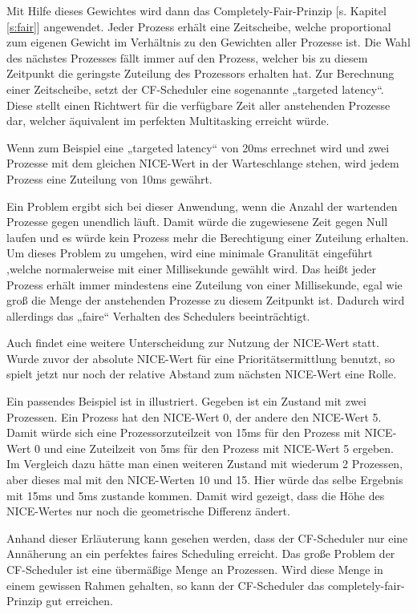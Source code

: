 Mit Hilfe dieses Gewichtes wird dann das \glqq Completely-Fair\grqq-Prinzip [s. Kapitel \ref{s:fair}] angewendet. Jeder Prozess erhält eine Zeitscheibe, welche proportional zum eigenen Gewicht im Verhältnis zu den Gewichten aller Prozesse ist. Die Wahl des nächstes Prozesses fällt immer auf den Prozess, welcher bis zu diesem Zeitpunkt die geringste Zuteilung des Prozessors erhalten hat.
Zur Berechnung einer Zeitscheibe, setzt der CF-Scheduler eine sogenannte „targeted latency“. Diese stellt einen Richtwert für die verfügbare Zeit aller anstehenden Prozesse dar, welcher äquivalent im perfekten Multitasking erreicht würde.

Wenn zum Beispiel eine „targeted latency“ von 20ms errechnet wird und zwei Prozesse mit dem gleichen \glqq NICE\grqq-Wert in der Warteschlange stehen, wird jedem Prozess eine Zuteilung von 10ms gewährt.

Ein Problem ergibt sich bei dieser Anwendung, wenn die Anzahl der wartenden Prozesse gegen unendlich läuft. Damit würde die zugewiesene Zeit gegen Null laufen und es würde kein Prozess mehr die Berechtigung einer Zuteilung erhalten. Um dieses Problem zu umgehen, wird eine minimale Granulität eingeführt ,welche normalerweise mit einer Millisekunde gewählt wird. Das heißt jeder Prozess erhält immer mindestens eine Zuteilung von einer Millisekunde, egal wie groß die Menge der anstehenden Prozesse zu diesem Zeitpunkt ist. Dadurch wird allerdings das „faire“ Verhalten des Schedulers beeinträchtigt. 

Auch findet eine weitere Unterscheidung zur Nutzung der \glqq NICE\grqq-Wert statt. Wurde zuvor der absolute \glqq NICE\grqq-Wert für eine Prioritätsermittlung benutzt, so spielt jetzt nur noch der relative Abstand zum nächsten \glqq NICE\grqq-Wert eine Rolle.

Ein passendes Beispiel ist in \cite{rlove} illustriert. Gegeben ist ein Zustand mit zwei Prozessen. Ein Prozess hat den \glqq NICE\grqq-Wert 0, der andere den \glqq NICE\grqq-Wert 5. Damit würde sich eine Prozessorzuteilzeit von 15ms für den Prozess mit \glqq NICE\grqq-Wert 0 und eine Zuteilzeit von 5ms für den Prozess mit \glqq NICE\grqq-Wert 5 ergeben.
Im Vergleich dazu hätte man einen weiteren Zustand mit wiederum 2 Prozessen, aber dieses mal mit den \glqq NICE\grqq-Werten 10 und 15. Hier würde das selbe Ergebnis mit 15ms und 5ms zustande kommen. Damit wird gezeigt, dass die Höhe des \glqq NICE\grqq-Wertes nur noch die geometrische Differenz ändert.

Anhand dieser Erläuterung kann gesehen werden, dass der CF-Scheduler nur eine Annäherung an ein perfektes faires Scheduling erreicht. Das große Problem der CF-Scheduler ist eine übermäßige Menge an Prozessen. Wird diese Menge in einem gewissen Rahmen gehalten, so kann der CF-Scheduler das \glqq completely-fair\grqq -Prinzip gut erreichen. 

